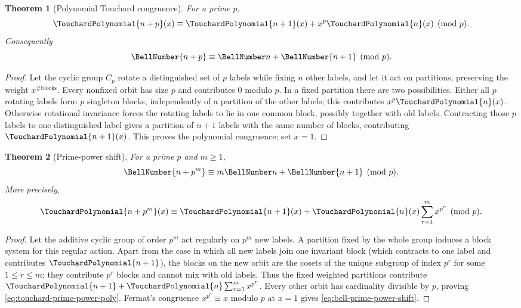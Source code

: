 \documentclass[11pt,a4paper,oneside,openany]{book}
\newtheorem{theorem}{Theorem}[chapter]
\theoremstyle{definition}
\theoremstyle{remark}
\begin{document}
\begin{theorem}[Polynomial Touchard congruence]\label{thm:touchard-poly}
For a prime $p$,
\begin{equation}\label{eq:touchard-poly}
 \TouchardPolynomial{n+p}(x)\equiv \TouchardPolynomial{n+1}(x)+x^p\TouchardPolynomial{n}(x)\pmod p.
\end{equation}
Consequently
\begin{equation}\label{eq:touchard}
 \BellNumber{n+p}\equiv\BellNumber n+\BellNumber{n+1}\pmod p.
\end{equation}
\end{theorem}
\begin{proof}
Let the cyclic group $C_p$ rotate a distinguished set of $p$ labels while fixing
$n$ other labels, and let it act on partitions, preserving the weight $x^{\#\text{
blocks}}$.  Every nonfixed orbit has size $p$ and contributes $0$ modulo $p$.
In a fixed partition there are two possibilities.  Either all $p$ rotating labels
form $p$ singleton blocks, independently of a partition of the other labels; this
contributes $x^p\TouchardPolynomial{n}(x)$.  Otherwise rotational invariance forces the rotating labels
to lie in one common block, possibly together with old labels.  Contracting those
$p$ labels to one distinguished label gives a partition of $n+1$ labels with the
same number of blocks, contributing $\TouchardPolynomial{n+1}(x)$.  This proves the polynomial
congruence; set $x=1$.
\end{proof}

\begin{theorem}[Prime-power shift]\label{thm:bell-prime-power-shift}
For a prime $p$ and $m\ge1$,
\begin{equation}\label{eq:bell-prime-power-shift}
 \BellNumber{n+p^m}\equiv m\BellNumber n+\BellNumber{n+1}\pmod p.
\end{equation}
More precisely,
\begin{equation}\label{eq:touchard-prime-power-poly}
 \TouchardPolynomial{n+p^m}(x)\equiv \TouchardPolynomial{n+1}(x)+\TouchardPolynomial{n}(x)\sum_{r=1}^{m}x^{p^r}
 \pmod p.
\end{equation}
\end{theorem}
\begin{proof}
Let the additive cyclic group of order $p^m$ act regularly on $p^m$ new labels.
A partition fixed by the whole group induces a block system for this regular
action.  Apart from the case in which all new labels join one invariant block
(which contracts to one label and contributes $\TouchardPolynomial{n+1}$), the blocks on the new
orbit are the cosets of the unique subgroup of index $p^r$ for some
$1\le r\le m$; they contribute $p^r$ blocks and cannot mix with old labels.
Thus the fixed weighted partitions contribute
$\TouchardPolynomial{n+1}+\TouchardPolynomial{n}\sum_{r=1}^m x^{p^r}$.  Every other orbit has cardinality divisible by
$p$, proving \eqref{eq:touchard-prime-power-poly}.  Fermat's congruence
$x^{p^r}\equiv x$ modulo $p$ at $x=1$ gives
\eqref{eq:bell-prime-power-shift}.
\end{proof}
\end{document}
